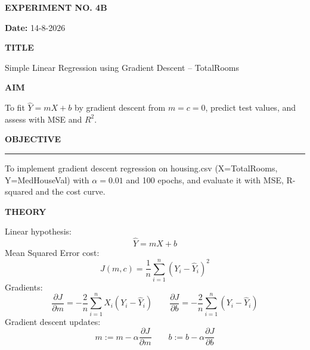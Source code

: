 \documentclass[11pt,twoside]{article}
\newcommand{\expheading}[1]{{\fontsize{14}{17}\selectfont\textbf{#1}\par}}
\newcommand{\fullrule}{\noindent\rule{\textwidth}{0.6pt}\par}
\begin{document}
{\setlength{\parskip}{0pt}\setlength{\abovedisplayskip}{0pt}\setlength{\belowdisplayskip}{0pt}
\begin{center}
\expheading{EXPERIMENT NO. 4B}
\end{center}
\vspace{2pt}

\noindent\textbf{Date:} 14-8-2026\par
\vspace{6pt}

\expheading{TITLE}
\vspace{4pt}
\noindent Simple Linear Regression using Gradient Descent -- TotalRooms\par
\vspace{4pt}

\expheading{AIM}
\vspace{4pt}
\noindent To fit $\hat{Y}=mX+b$ by gradient descent from $m=c=0$, predict test values, and assess with MSE and $R^2$. \par
\vspace{4pt}

\expheading{OBJECTIVE}
\vspace{2pt}
\fullrule
\vspace{4pt}
\noindent To implement gradient descent regression on housing.csv (X=TotalRooms, Y=MedHouseVal) with $\alpha=0.01$ and 100 epochs, and evaluate it with MSE, R-squared and the cost curve. \par
\vspace{4pt}

\expheading{THEORY}
\vspace{4pt}
Linear hypothesis:
\[\hat{Y}=mX+b\]
Mean Squared Error cost:
\[J(m,c)=\frac{1}{n}\sum_{i=1}^{n}(Y_i-\hat{Y}_i)^2\]
Gradients:
\[\frac{\partial J}{\partial m}=-\frac{2}{n}\sum_{i=1}^{n}X_i(Y_i-\hat{Y}_i)\qquad \frac{\partial J}{\partial b}=-\frac{2}{n}\sum_{i=1}^{n}(Y_i-\hat{Y}_i)\]
Gradient descent updates:
\[m:=m-\alpha\frac{\partial J}{\partial m}\qquad b:=b-\alpha\frac{\partial J}{\partial b}\]
\vspace{4pt}

}
\end{document}
